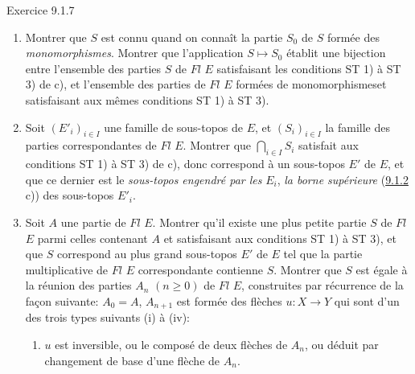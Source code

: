 \documentclass[10pt]{../fichiers-configuration-latex/smfart}
\begin{document}
\begin{enonce*}[remark]{Exercice 9.1.7}
\begin{enumerate}
\begin{itemize}
\item[ST 3)] Si $u:X\rightarrow Y$ est tel qu'il existe une famille
couvrante $Y_i\rightarrow Y$, $i\in I$, tel que
$u_i:X_i=\fprod{X}{Y_i}{Y}\to Y_{i}$ est dans $S$ pour tout $i\in
I$, alors $u\in S$.
\end{itemize}

Montrer qu'on obtient ainsi une correspondance biunivoque entre
l'ensemble des sous-topos $E'$ de $E$, et l'ensemble des parties $S$
de $Fl$ $E$ satisfaisant aux conditions ST 1), ST 2), ST 3). ($S$
étant donné, lui associer une $𝒰$-topologie $T'$, plus fine
que la topologie canonique $T$ de $E$, dont les familles couvrantes
$(X_i\rightarrow X)_{i\in I}$ sont celles pour lesquelles
l'inclusion $X'\hookrightarrow X$ de l'image des $X_i$ est $\in S$.
Montrer que la catégorie des faisceaux pour $T'$ est équivalente à
un sous-topos $E'$ de $E$, et utiliser . pour
prouver que celui-ci redonne $S$.

\item Montrer que $S$ est connu quand on connaît la partie $S_0$ de
$S$ formée des \emph{monomorphismes}. Montrer que l'application
$S\mapsto S_0$ établit une bijection entre l'ensemble des parties
$S$ de $Fl$ $E$ satisfaisant les conditions ST 1) à ST 3) de c), et
l'ensemble des parties de $Fl$ $E$ formées de
monomorphismes\pageoriginale et satisfaisant aux mêmes conditions ST
1) à ST 3).

\item Soit $(E'_i)_{i\in I}$ une famille de sous-topos de $E$, et
$(S_i)_{i\in I}$ la famille des parties correspondantes de $Fl$ $E$.
Montrer que $\bigcap_{i\in I} S_i$ satisfait aux conditions ST 1) à
ST 3) de c), donc correspond à un sous-topos $E'$ de $E$, et que ce
dernier est le \emph{sous-topos engendré par les} $E_i$, \ie
\emph{la borne supérieure} (\cf \hyperref[IV.rem9.1.2]{9.1.2} c)) des sous-topos
$E'_i$.

\item Soit $A$ une partie de $Fl$ $E$. Montrer qu'il existe une plus
petite partie $S$ de $Fl$ $E$ parmi celles contenant $A$ et
satisfaisant aux conditions ST 1) à ST 3), et que $S$ correspond au
plus grand sous-topos $E'$ de $E$ tel que la partie multiplicative
de $Fl$ $E$ correspondante contienne $S$. Montrer que $S$ est égale
à la réunion des parties $A_n$ $(n\geq 0)$ de $Fl$ $E$, construites
par récurrence de la façon suivante: $A_0=A$, $A_{n+1}$ est
formée des flèches $u:X\rightarrow Y$ qui sont d'un des trois types
suivants (i) à (iv):
\begin{enumerate}
\renewcommand{\theenumii}{\roman{enumii}}
\renewcommand{\labelenumii}{(\theenumii)}
\item $u$ est inversible, ou le composé de deux flèches de $A_n$,
ou déduit par changement de base d'une flèche de $A_n$.


\end{enumerate}
\end{enumerate}
\end{enonce*}
\end{document}
